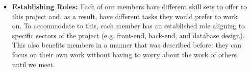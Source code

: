 \begin{itemize}
  \item \textbf{Establishing Roles:} Each of our members have different skill sets to offer to this project and, as a result, have different tasks they would prefer to work on. To accommodate to this, each member has an established role aligning to specific sectors of the project (e.g. front-end, back-end, and database design). This also benefits members in a manner that was described before: they can focus on their own work without having to worry about the work of others until we meet.
\end{itemize}
